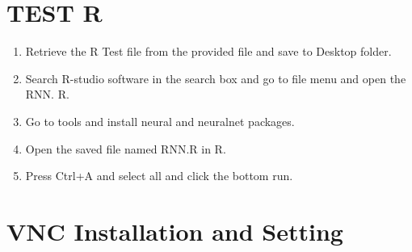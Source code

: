 \documentclass[12pt]{article}
\begin{document}
\section{TEST R}\label{TEST R}

\begin{enumerate}
     \item Retrieve the R Test file from the provided file and save to Desktop folder.
     \item Search R-studio software in the search box and go to file menu and open the RNN. R.
     \item Go to tools and install neural and neuralnet packages.
     \item Open the saved file named RNN.R in R.
     \item Press Ctrl+A and select all and click the bottom run.
\end{enumerate}
\newpage
\section{VNC Installation and Setting}\label{VNC Installation }
\end{document}
